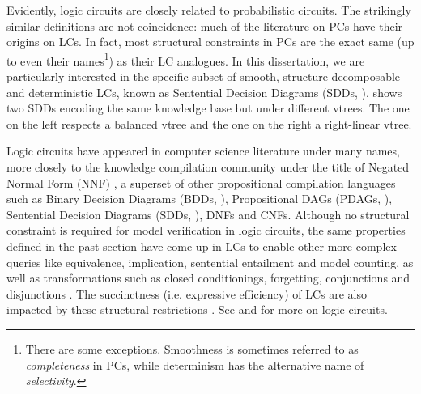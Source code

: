 Evidently, logic circuits are closely related to probabilistic circuits. The strikingly similar
definitions are not coincidence: much of the literature on PCs have their origins on LCs. In fact,
most structural constraints in PCs are the exact same (up to even their names\footnote{There are
some exceptions. Smoothness is sometimes referred to as \emph{completeness} in PCs, while
determinism has the alternative name of \emph{selectivity}.}) as their LC analogues. In this
dissertation, we are particularly interested in the specific subset of smooth, structure
decomposable and deterministic LCs, known as Sentential Decision Diagrams (SDDs,
\cite{darwiche11}).  shows two SDDs encoding the same knowledge base but under
different vtrees. The one on the left respects a balanced vtree and the one on the right a
right-linear vtree.

Logic circuits have appeared in computer science literature under many names, more closely to the
knowledge compilation community under the title of Negated Normal Form (NNF)
\citep{darwiche01b,darwiche99}, a superset of other propositional compilation languages such as
Binary Decision Diagrams (BDDs, \cite{bryant86}), Propositional DAGs (PDAGs, \cite{wachter06}),
Sentential Decision Diagrams (SDDs, \cite{darwiche11}), DNFs and CNFs. Although no structural
constraint is required for model verification in logic circuits, the same properties defined in the
past section have come up in LCs to enable other more complex queries like equivalence,
implication, sentential entailment and model counting, as well as transformations such as closed
conditionings, forgetting, conjunctions and disjunctions \citep{darwiche02}. The succinctness (i.e.
expressive efficiency) of LCs are also impacted by these structural restrictions
\citep{gogic95,papadimitriou94,darwiche02}.  See \citet{darwiche02} and \citet{darwiche20} for more
on logic circuits.

